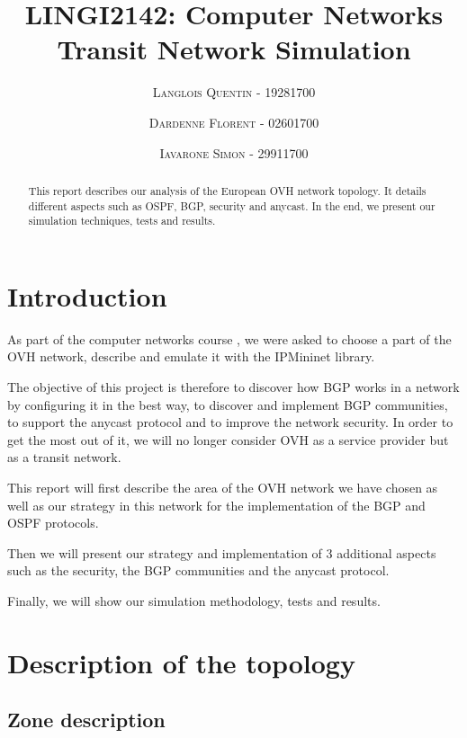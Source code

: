 \documentclass[letter, 9pt, conference]{ieeeconf}
\title{LINGI2142: Computer Networks \\ Transit Network Simulation}
\author{\textsc{Langlois Quentin} - 19281700 \and \textsc{Dardenne Florent} - 02601700 \and \textsc{Iavarone Simon - 29911700 }}
\begin{document}
\maketitle
\thispagestyle{empty}
\pagestyle{empty}


\begin{abstract}

This report describes our analysis of the European OVH network topology. It details different aspects such as OSPF, BGP, security and anycast. In the end, we present our simulation techniques, tests and results. 

\end{abstract}


\section{Introduction}

As part of the computer networks course \cite{LINGI2142}, we were asked to choose a part of the OVH network, describe and emulate it with the IPMininet \cite{ipmininet} library.

The objective of this project is therefore to discover how BGP works in a network by configuring it in the best way, to discover and implement BGP communities, to support the anycast protocol and to improve the network security. In order to get the most out of it, we will no longer consider OVH as a service provider but as a transit network.

This report will first describe the area of the OVH network we have chosen as well as our strategy in this network for the implementation of the BGP and OSPF protocols.

Then we will present our strategy and implementation of 3 additional aspects such as the security, the BGP communities and the anycast protocol. 

Finally, we will show our simulation methodology, tests and results. 

\section{Description of the topology}

\subsection{Zone description}
\end{document}
